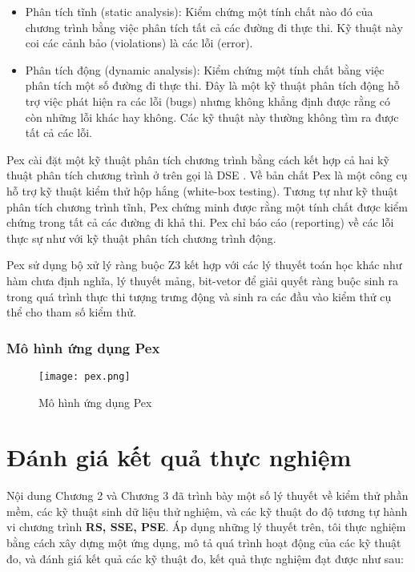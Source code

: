 \begin{itemize}
	\item Phân tích tĩnh (static analysis): Kiểm chứng một tính chất nào đó của chương trình bằng việc phân tích tất cả các đường đi thực thi. Kỹ thuật này coi các cảnh bảo (violations) là các lỗi (error).
	\item Phân tích động (dynamic analysis): Kiểm chứng một tính chất bằng việc phân tích một số đường đi thực thi. Đây là một kỹ thuật phân tích động hỗ trợ việc phát hiện ra các lỗi (bugs) nhưng không khẳng định được rằng có còn những lỗi khác hay không. Các kỹ thuật này thường không tìm ra được tất cả các lỗi.
\end{itemize}

Pex cài đặt một kỹ thuật phân tích chương trình bằng cách kết hợp cả hai kỹ thuật phân tích chương trình ở trên gọi là DSE \cite{xie2009fitness, godefroid2005dart}. Về bản chất Pex là một công cụ hỗ trợ kỹ thuật kiểm thử hộp hắng (white-box testing). Tương tự như kỹ thuật phân tích chương trình tĩnh, Pex chứng minh được rằng một tính chất được kiểm chứng trong tất cả các đường đi khả thi. Pex chỉ báo cáo (reporting) về các lỗi thực sự như với kỹ thuật phân tích chương trình động.

Pex sử dụng bộ xử lý ràng buộc Z3 \cite{de2008z3} kết hợp với các lý thuyết toán học khác như hàm chưa định nghĩa, lý thuyết mảng, bit-vetor \cite{kroening2016decision} để giải quyết ràng buộc sinh ra trong quá trình thực thi tượng trưng động và sinh ra các đầu vào kiểm thử cụ thể cho tham số kiểm thử.

\subsubsection*{Mô hình ứng dụng Pex}
\begin{center}
	\begin{figure}[H]
		\begin{center}
			\texttt{[image: pex.png]}
		\end{center}
		\caption{Mô hình ứng dụng Pex}
		
	\end{figure}
\end{center}

\section{Đánh giá kết quả thực nghiệm}

Nội dung Chương 2 và Chương 3 đã trình bày một số lý thuyết về kiểm
thử phần mềm, các kỹ thuật sinh dữ liệu thử nghiệm, và các kỹ thuật đo
độ tương tự hành vi chương trình \textbf{RS, SSE, PSE}. Áp dụng những
lý thuyết trên, tôi thực nghiệm bằng cách xây dựng một ứng dụng, mô tả
quá trình hoạt động của các kỹ thuật đo, và đánh giá kết quả các kỹ
thuật đo, kết quả thực nghiệm đạt được như sau:

